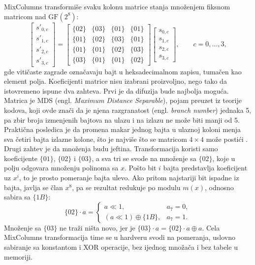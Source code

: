 MixColumns transformiše svaku kolonu matrice stanja množenjem fiksnom matricom nad $\mathrm{GF}(2^8)$:
\begin{equation}
\begin{bmatrix} s'_{0,c} \\ s'_{1,c} \\ s'_{2,c} \\ s'_{3,c} \end{bmatrix}
=
\begin{bmatrix}
\{02\} & \{03\} & \{01\} & \{01\} \\
\{01\} & \{02\} & \{03\} & \{01\} \\
\{01\} & \{01\} & \{02\} & \{03\} \\
\{03\} & \{01\} & \{01\} & \{02\}
\end{bmatrix}
\begin{bmatrix} s_{0,c} \\ s_{1,c} \\ s_{2,c} \\ s_{3,c} \end{bmatrix},
\qquad c = 0, \ldots, 3,
\label{eq:mixcolumns}
\end{equation}
gde vitičaste zagrade označavaju bajt u heksadecimalnom zapisu, tumačen kao element polja.
\smallbreak
Koeficijenti matrice nisu izabrani proizvoljno, nego tako da istovremeno ispune dva zahteva. Prvi je da difuzija bude najbolja moguća. Matrica je MDS (engl. \textit{Maximum Distance Separable}), pojam preuzet iz teorije kodova, koji ovde znači da je njena razgranatost (engl. \textit{branch number}) jednaka 5, pa zbir broja izmenjenih bajtova na ulazu i na izlazu ne može biti manji od 5. Praktična posledica je da promena makar jednog bajta u ulaznoj koloni menja sva četiri bajta izlazne kolone, što je najviše što se matricom $4 \times 4$ može postići \cite{daemen_rijndael}.
\smallbreak
Drugi zahtev je da množenja budu jeftina. Transformacija koristi samo koeficijente $\{01\}$, $\{02\}$ i $\{03\}$, a sva tri se svode na množenje sa $\{02\}$, koje u polju odgovara množenju polinoma sa $x$. Pošto bit $i$ bajta predstavlja koeficijent uz $x^i$, to je prosto pomeranje bajta ulevo. Ako pritom najstariji bit ispadne iz bajta, javlja se član $x^8$, pa se rezultat redukuje po modulu $m(x)$, odnosno sabira sa $\{1B\}$:
\begin{equation}
    \{02\} \cdot a =
    \begin{cases}
        a \ll 1, & a_7 = 0,\\[2pt]
        (a \ll 1) \oplus \{1B\}, & a_7 = 1.
    \end{cases}
    \label{eq:mul02}
\end{equation}
Množenje sa $\{03\}$ ne traži ništa novo, jer je $\{03\} \cdot a = \{02\} \cdot a \oplus a$. Cela MixColumns transformacija time se u hardveru svodi na pomeranja, uslovno sabiranje sa konstantom i XOR operacije, bez ijednog množača i bez tabele u memoriji.

